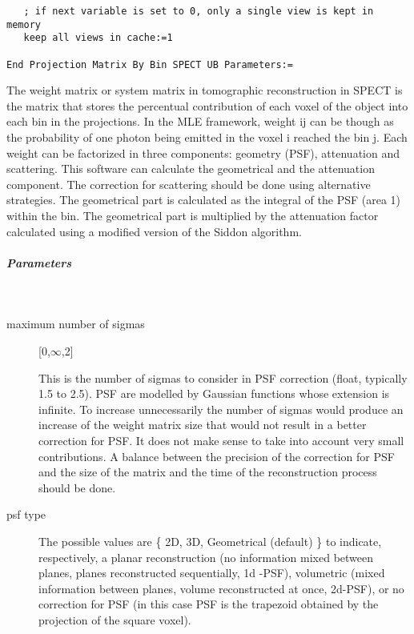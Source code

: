 \documentclass{article}
\newcommand{\subsubsubsubsection}[1]{\subparagraph{#1} \mbox{} \\}
\begin{document}
{{{\begin{verbatim}
   ; if next variable is set to 0, only a single view is kept in memory
   keep all views in cache:=1

End Projection Matrix By Bin SPECT UB Parameters:=
\end{verbatim}

The weight matrix or system matrix in tomographic reconstruction in SPECT is the matrix that stores the
percentual contribution of each voxel of the object into each bin in the projections. In the MLE
framework, weight ij can be though as the probability of one photon being emitted in the voxel i reached
the bin j. Each weight can be factorized in three components: geometry (PSF), attenuation and scattering.
This software can calculate the geometrical and the attenuation component. The correction for scattering
should be done using alternative strategies. The geometrical part is calculated as the integral of the
PSF (area 1) within the bin. The geometrical part is multiplied by the attenuation factor calculated
using a modified version of the Siddon algorithm.  

{ \subsubsubsubsection{Parameters}
}
\begin{description}
\item[maximum number of sigmas] [0,$\infty$,2{]}

  This is the number of sigmas to consider in PSF correction (float, typically 1.5 to 2.5). PSF are
  modelled by Gaussian functions whose extension is infinite. To increase unnecessarily the number of
  sigmas would produce an increase of the weight matrix size that would not result in a better correction
  for PSF. It does not make sense to take into account very small contributions. A balance between the
  precision of the correction for PSF and the size of the matrix and the time of the reconstruction
  process should be done.

%	

\item[psf type] 
 
  The possible values are \{ 2D, 3D, Geometrical (default) \} to indicate, respectively, a planar
  reconstruction (no information mixed between planes, planes reconstructed sequentially, 1d -PSF),
  volumetric (mixed information between planes, volume reconstructed at once, 2d-PSF), or no correction
  for PSF (in this case PSF is the trapezoid obtained by the projection of the square voxel).


\end{description}}}}
\end{document}
